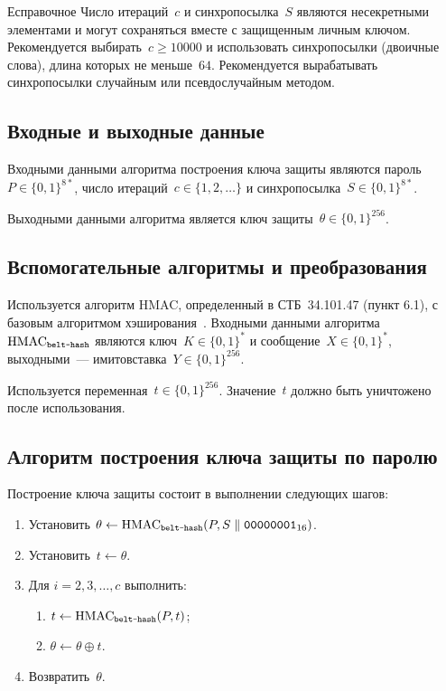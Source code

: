 \begin{appendix}{Е}{справочное}
Число итераций~$c$ и синхропосылка~$S$ являются несекретными элементами
и могут сохраняться вместе с защищенным личным ключом.
%
Рекомендуется выбирать~$c\geq 10000$ и
использовать синхропосылки (двоичные слова), 
длина которых не меньше~$64$. 
%
Рекомендуется вырабатывать синхропосылки случайным 
или псевдослучайным методом.


\label{PASSWORD.PBKDF}

\subsection{Входные и выходные данные}
\label{PASSWORD.PBKDF.IO}

Входными данными алгоритма построения ключа защиты являются
пароль~$P\in\{0,1\}^{8*}$, 
число итераций~$c\in\{1,2,\ldots\}$
и синхропосылка~$S\in\{0,1\}^{8*}$.

Выходными данными алгоритма является ключ 
защиты~$\theta\in\{0,1\}^{256}$.
  
\subsection{Вспомогательные алгоритмы и преобразования}
\label{PASSWORD.PBKDF.Aux}
 
Используется алгоритм HMAC,
определенный в СТБ~34.101.47 (пункт 6.1),
с базовым алгоритмом хэширования~.
Входными данными алгоритма~$\text{\normalfont HMAC}_{\texttt{belt-hash}}$ являются 
ключ~$K\in\{0,1\}^*$ и сообщение~$X\in\{0,1\}^*$,
выходными~--- имитовставка~$Y\in\{0,1\}^{256}$.

Используется переменная~$t\in\{0,1\}^{256}$.
Значение~$t$ должно быть уничтожено после использования.

\subsection{Алгоритм построения ключа защиты по паролю}
\label{PASSWORD.PBKDF.Alg}

Построение ключа защиты состоит в выполнении следующих шагов:
\begin{enumerate}
\item
Установить
$\theta\leftarrow\text{\normalfont HMAC}_{\texttt{belt-hash}}
(P,S\parallel \texttt{00000001}_{16})$.
\item
Установить~$t\leftarrow \theta$.
\item
Для $i=2,3,\ldots,c$ выполнить:
\begin{enumerate}
\item
$t\leftarrow\text{\normalfont HMAC}_{\texttt{belt-hash}}(P,t)$;
\item
$\theta\leftarrow\theta\oplus t$.
\end{enumerate}
\item
Возвратить~$\theta$.
\end{enumerate}


\end{appendix}
